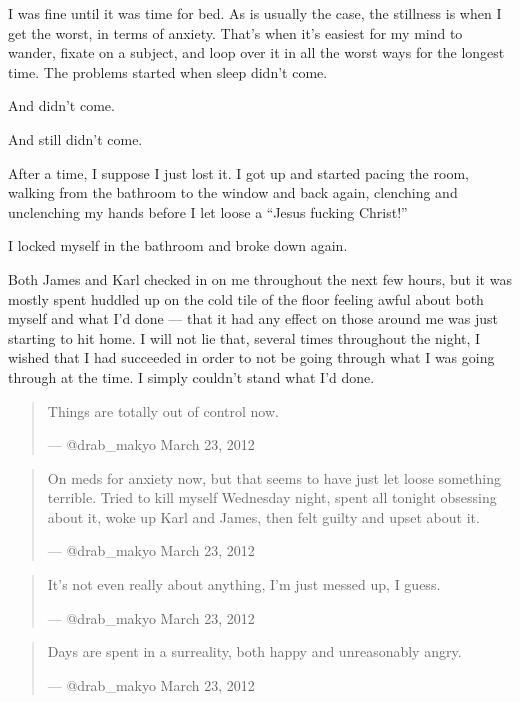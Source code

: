 \begin{paracol}{2}
\begin{leftcolumn}
I was fine until it was time for bed. As is usually the case, the stillness is when I get the worst, in terms of anxiety. That's when it's easiest for my mind to wander, fixate on a subject, and loop over it in all the worst ways for the longest time. The problems started when sleep didn't come.

And didn't come.

And still didn't come.

After a time, I suppose I just lost it. I got up and started pacing the room, walking from the bathroom to the window and back again, clenching and unclenching my hands before I let loose a ``Jesus fucking Christ!''

I locked myself in the bathroom and broke down again.

Both James and Karl checked in on me throughout the next few hours, but it was mostly spent huddled up on the cold tile of the floor feeling awful about both myself and what I'd done --- that it had any effect on those around me was just starting to hit home. I will not lie that, several times throughout the night, I wished that I had succeeded in order to not be going through what I was going through at the time. I simply couldn't stand what I'd done.
\newpage

\begin{quotation}
  \noindent Things are totally out of control now.

--- @drab\_makyo March 23, 2012
\end{quotation}

\begin{quotation}
\noindent On meds for anxiety now, but that seems to have just let loose something terrible. Tried to kill myself Wednesday night, spent all tonight obsessing about it, woke up Karl and James, then felt guilty and upset about it.

--- @drab\_makyo March 23, 2012
\end{quotation}

\begin{quotation}
\noindent It's not even really about anything, I'm just messed up, I guess.

--- @drab\_makyo March 23, 2012
\end{quotation}

\begin{quotation}
\noindent Days are spent in a surreality, both happy and unreasonably angry.

--- @drab\_makyo March 23, 2012
\end{quotation}


\end{leftcolumn}
\end{paracol}
